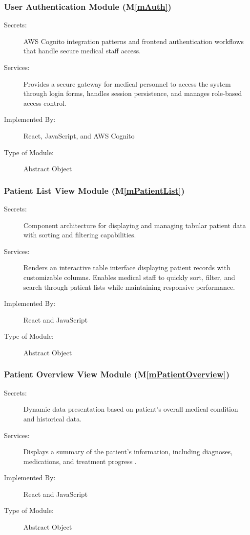 \documentclass[12pt, titlepage]{article}
\newcommand{\mref}[1]{M\ref{#1}}
\begin{document}
\subsubsection{User Authentication Module (\mref{mAuth})}
\begin{description}
\item[Secrets:] AWS Cognito integration patterns and frontend authentication workflows that handle secure medical staff access.
\item[Services:] Provides a secure gateway for medical personnel to access the system through login forms, handles session persistence, and manages role-based access control.
\item[Implemented By:] React, JavaScript, and AWS Cognito
\item[Type of Module:] Abstract Object
\end{description}

\subsubsection{Patient List View Module (\mref{mPatientList})}
\begin{description}
\item[Secrets:] Component architecture for displaying and managing tabular patient data with sorting and filtering capabilities.
\item[Services:] Renders an interactive table interface displaying patient records with customizable columns. Enables medical staff to quickly sort, filter, and search through patient lists while maintaining responsive performance.
\item[Implemented By:] React and JavaScript
\item[Type of Module:] Abstract Object
\end{description}

\subsubsection{Patient Overview View Module (\mref{mPatientOverview})}
\begin{description}
\item[Secrets:] Dynamic data presentation based on patient's overall medical condition and historical data.
\item[Services:] Displays a summary of the patient's information, including diagnoses, medications, and treatment progress .
\item[Implemented By:] React and JavaScript
\item[Type of Module:] Abstract Object
\end{description}
\end{document}
